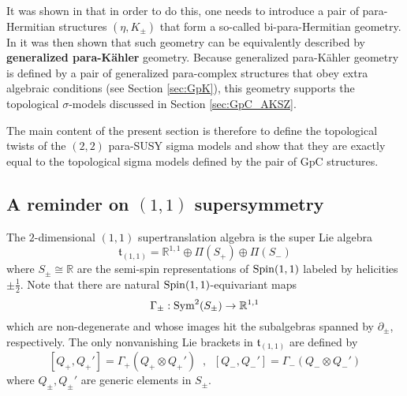 \documentclass[letterpaper,12pt]{article}
\newcommand{\RR}{\mathbb{R}}
\theoremstyle{definition}
\theoremstyle{remark}
\theoremstyle{examples}
\begin{document}
It was shown in \cite{HullTwistedSUSY} that in order to do this, one needs to introduce a pair of para-Hermitian structures $(\eta,K_\pm)$ that form a so-called bi-para-Hermitian geometry. In \cite{Hu:2019zro} it was then shown that such geometry can be equivalently described by {\bf generalized para-K\"ahler} geometry. Because generalized para-K\"ahler geometry is defined by a pair of generalized para-complex structures that obey extra algebraic conditions (see Section \ref{sec:GpK}), this geometry supports the topological $\sigma$-models discussed in Section \ref{sec:GpC_AKSZ}.

The main content of the present section is therefore to define the topological twists of the $(2,2)$ para-SUSY sigma models and show that they are exactly equal to the topological sigma models defined by the pair of GpC structures.
%
%

\subsection{A reminder on $(1,1)$ supersymmetry}

The $2$-dimensional $(1,1)$ supertranslation algebra is the super Lie algebra
\[
\mathfrak{t}_{(1,1)} = \RR^{1,1} \oplus \Pi (S_+) \oplus \Pi(S_-)
\]
where $S_\pm \cong \RR$ are the semi-spin representations of ${\rm Spin}(1,1)$ labeled by helicities $\pm \frac{1}{2}$. 
Note that there are natural ${\rm Spin}(1,1)$-equivariant maps
\[
\Gamma_{\pm} : {\rm Sym}^2(S_\pm) \to \RR^{1,1}
\]
which are non-degenerate and whose images hit the subalgebras spanned by $\partial_{\pm}$, respectively. 
The only nonvanishing Lie brackets in $\mathfrak{t}_{(1,1)}$ are defined by
\[
[Q_+, Q_+'] = \Gamma_+(Q_+ \otimes Q_+') \;\; , \;\; [Q_-, Q_-'] = \Gamma_-(Q_- \otimes Q_-')
\]  
where $Q_\pm, Q_\pm'$ are generic elements in $S_\pm$. 
\end{document}

